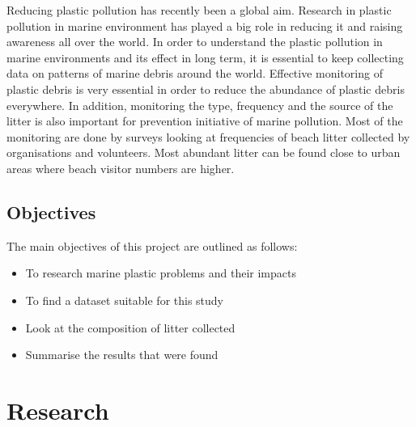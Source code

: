 \documentclass[10pt]{article}\usepackage[]{graphicx}\usepackage[]{color}
\begin{document}
Reducing plastic pollution has recently been a global aim. Research in plastic pollution in marine environment has played a big role in reducing it and raising awareness all over the world. In order to understand the plastic pollution in marine environments and its effect in long term, it is essential to keep collecting data on patterns of marine debris around the world. Effective monitoring of plastic debris is very essential in order to reduce the abundance of plastic debris everywhere. In addition, monitoring the type, frequency and the source of the litter is also important for prevention initiative of marine pollution. Most of the monitoring are done by surveys looking at frequencies of beach litter collected by organisations and volunteers.\cite{COE1997} Most abundant litter can be found close to urban areas where beach visitor numbers are higher.\cite{GARRITY1993}


\subsection{Objectives }\label{obj}

The main objectives of this project are outlined as follows:
\begin{itemize}	
\item To research marine plastic problems and their impacts
\item To find a dataset suitable for this study
\item	Look at the composition of litter collected 
\item	Summarise the results that were found
\end{itemize}

























\pagebreak
\section{Research}\label{research}
\end{document}
